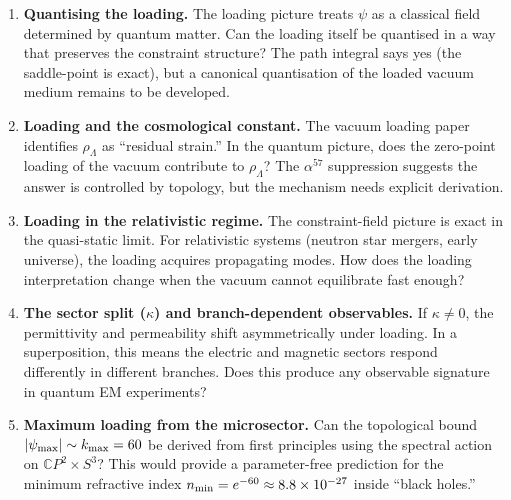 \documentclass[11pt,a4paper]{article}
\newcommand{\CP}{\mathbb{C}P}
\begin{document}
\begin{enumerate}
\item \textbf{Quantising the loading.}  The loading picture treats $\psi$ as
a classical field determined by quantum matter.  Can the loading itself be
quantised in a way that preserves the constraint structure?  The path
integral says yes (the saddle-point is exact), but a canonical
quantisation of the loaded vacuum medium remains to be developed.

\item \textbf{Loading and the cosmological constant.}  The vacuum loading
paper identifies $\rho_\Lambda$ as ``residual strain.''  In the quantum
picture, does the zero-point loading of the vacuum contribute to
$\rho_\Lambda$?  The $\alpha^{57}$ suppression suggests the answer is
controlled by topology, but the mechanism needs explicit derivation.

\item \textbf{Loading in the relativistic regime.}  The constraint-field
picture is exact in the quasi-static limit.  For relativistic systems
(neutron star mergers, early universe), the loading acquires propagating
modes.  How does the loading interpretation change when the vacuum
cannot equilibrate fast enough?

\item \textbf{The sector split ($\kappa$) and branch-dependent observables.}
If $\kappa \neq 0$, the permittivity and permeability shift
asymmetrically under loading.  In a superposition, this means the
electric and magnetic sectors respond differently in different branches.
Does this produce any observable signature in quantum EM experiments?

\item \textbf{Maximum loading from the microsector.}  Can the topological
bound $|\psi_{\rm max}| \sim k_{\rm max} = 60$ be derived from first
principles using the spectral action on $\CP^2 \times S^3$?  This would
provide a parameter-free prediction for the minimum refractive index
$n_{\rm min} = e^{-60} \approx 8.8 \times 10^{-27}$ inside ``black
holes.''
\end{enumerate}
\end{document}
